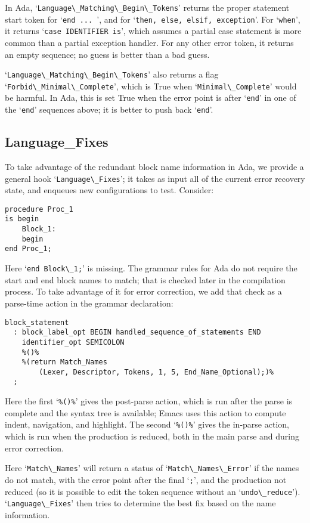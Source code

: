 \documentclass{article}
\newcommand{\code}[1]{`\lstinline|#1|'}
\begin{document}
In Ada, \code{Language\_Matching\_Begin\_Tokens} returns the proper
statement start token for \code{end ... }, and for
\code{then, else, elsif, exception}. For \code{when}, it returns
\code{case IDENTIFIER is}, which assumes a partial case statement is
more common than a partial exception handler. For any other error
token, it returns an empty sequence; no guess is better than a bad
guess.

\code{Language\_Matching\_Begin\_Tokens} also returns a flag
\code{Forbid\_Minimal\_Complete}, which is True when
\code{Minimal\_Complete} would be harmful. In Ada, this is set True
when the error point is after \code{end} in one of the \code{end}
sequences above; it is better to push back \code{end}.

\subsection{Language\_Fixes}
To take advantage of the redundant block name information in Ada, we
provide a general hook \code{Language\_Fixes}; it takes as input all of
the current error recovery state, and enqueues new configurations to
test.
Consider:
\begin{lstlisting}
procedure Proc_1
is begin
    Block_1:
    begin
end Proc_1;
\end{lstlisting}
Here \code{end Block\_1;} is missing. The grammar rules for Ada do not
require the start and end block names to match; that is checked later
in the compilation process. To take advantage of it for error
correction, we add that check as a parse-time action in the grammar
declaration:
\begin{verbatim}
block_statement
  : block_label_opt BEGIN handled_sequence_of_statements END
    identifier_opt SEMICOLON
    %()%
    %(return Match_Names
        (Lexer, Descriptor, Tokens, 1, 5, End_Name_Optional);)%
  ;
\end{verbatim}
Here the first `\verb|%()%|' gives the post-parse action, which is run
after the parse is complete and the syntax tree is available; Emacs
uses this action to compute indent, navigation, and highlight. The
second `\verb|%()%|' gives the in-parse action, which is run when the
production is reduced, both in the main parse and during error
correction.

Here \code{Match\_Names} will return a status of
\code{Match\_Names\_Error} if the names do not match, with the error
point after the final \code{;}, and the production not reduced (so it
is possible to edit the token sequence without an
\code{undo\_reduce}). \code{Language\_Fixes} then tries to determine
the best fix based on the name information.
\end{document}
